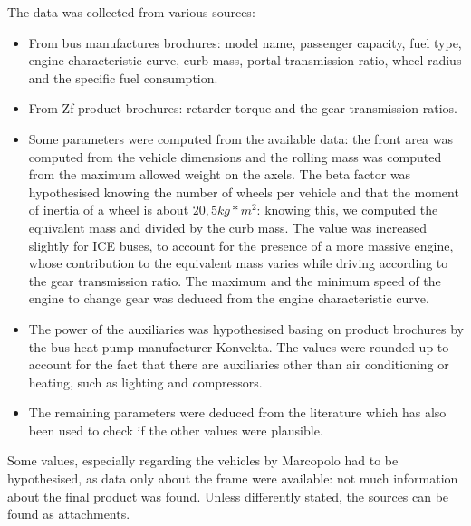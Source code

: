 \documentclass{article}
\begin{document}
The data was collected from various sources:
\begin{itemize}
\item From bus manufactures brochures: model name, passenger capacity, fuel type, engine characteristic curve, curb mass, portal transmission ratio, wheel radius and the specific fuel consumption. 
\item From Zf product brochures: retarder torque and the gear transmission ratios. 
\item Some parameters were computed from the available data: the front area was computed from the vehicle dimensions and the rolling mass was computed from the maximum allowed weight on the axels. The beta factor was hypothesised knowing the number of wheels per vehicle and that the moment of inertia of a wheel is about $20,5 kg*m^{2}$: knowing this, we computed the equivalent mass and divided by the curb mass. The value was increased slightly for ICE buses, to account for the presence of a more massive engine, whose contribution to the equivalent mass varies while driving according to the gear transmission ratio. The maximum and the minimum speed of the engine to change gear was deduced from the engine characteristic curve. 
\item The power of the auxiliaries was hypothesised basing on product brochures by the bus-heat pump manufacturer Konvekta. The values were rounded up to account for the fact that there are auxiliaries other than air conditioning or heating, such as lighting and compressors. 
\item The remaining parameters were deduced from the literature\cite{4}\cite{5} which has also been used to check if the other values were plausible. 
\end{itemize}
Some values, especially regarding the vehicles by Marcopolo had to be hypothesised, as data only about the frame were available: not much information about the final product was found. Unless differently stated, the sources can be found as attachments. 
\end{document}
